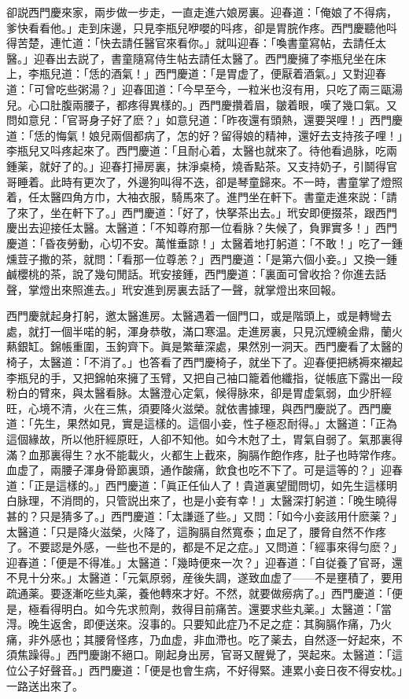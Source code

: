 卻説西門慶來家，兩步做一步走，一直走進六娘房裏。迎春道：「俺娘了不得病，爹快看看他。」走到床邊，只見李瓶兒咿嚶的呌疼，卻是胃脘作疼。西門慶聽他呌得苦楚，連忙道：「快去請任醫官來看你。」就叫迎春：「喚書童寫帖，去請任太醫。」迎春出去説了，書童隨寫侍生帖去請任太醫了。西門慶擁了李瓶兒坐在床上，李瓶兒道：「恁的酒氣！」西門慶道：「是胃虚了，便厭着酒氣。」又對迎春道：「可曾吃些粥湯？」迎春囬道：「今早至今，一粒米也沒有用，只吃了兩三甌湯兒。心口肚腹兩腰子，都疼得異樣的。」西門慶攢着眉，皺着眼，嘆了幾口氣。又問如意兒：「官哥身子好了麽？」如意兒道：「昨夜還有頭熱，還要哭哩！」西門慶道：「恁的悔氣！娘兒兩個都病了，怎的好？留得娘的精神，還好去支持孩子哩！」李瓶兒又呌疼起來了。西門慶道：「且耐心着，太醫也就來了。待他看過脉，吃兩鍾薬，就好了的。」迎春打掃房裏，抹淨桌椅，燒香點茶。又支持奶子，引鬬得官哥睡着。此時有更次了，外邊狗叫得不迭，卻是琴童歸來。不一時，書童掌了燈照着，任太醫四角方巾，大袖衣服，騎馬來了。進門坐在軒下。書童走進來説：「請了來了，坐在軒下了。」西門慶道：「好了，快拏茶出去。」玳安即便掇茶，跟西門慶出去迎接任太醫。太醫道：「不知尊府那一位看脉？失候了，負罪實多！」西門慶道：「昏夜勞動，心切不安。萬惟垂諒！」太醫着地打躬道：「不敢！」吃了一鍾燻荳子撒的茶，就問：「看那一位尊恙？」西門慶道：「是第六個小妾。」又換一鍾鹹櫻桃的茶，說了幾句閒話。玳安接鍾，西門慶道：「裏面可曾收拾？你進去話聲，掌燈出來照進去。」玳安進到房裏去話了一聲，就掌燈出來回報。

西門慶就起身打躬，邀太醫進房。太醫遇着一個門口，或是階頭上，或是轉彎去處，就打一個半喏的躬，渾身恭敬，滿口寒温。走進房裏，只見沉煙繞金鼎，蘭火爇銀缸。錦帳重圍，玉鉤齊下。眞是繁華深處，果然別一洞天。西門慶看了太醫的椅子，太醫道：「不消了。」也答看了西門慶椅子，就坐下了。迎春便把綉褥來襯起李瓶兒的手，又把錦帕來擁了玉臂，又把自己袖口籠着他纖指，従帳底下露出一段粉白的臂來，與太醫看脉。太醫澄心定氣，候得脉來，卻是胃虚氣弱，血少肝經旺，心境不清，火在三焦，須要降火滋榮。就依書據理，與西門慶説了。西門慶道：「先生，果然如見，實是這樣的。這個小妾，性子極忍耐得。」太醫道：「正為這個緣故，所以他肝經原旺，人卻不知他。如今木尅了土，胃氣自弱了。氣那裏得滿？血那裏得生？水不能載火，火都生上截來，胸膈作飽作疼，肚子也時常作疼。血虚了，兩腰子渾身骨節裏頭，通作酸痛，飲食也吃不下了。可是這等的？」迎春道：「正是這樣的。」西門慶道：「眞正任仙人了！貴道裏望聞問切，如先生這樣明白脉理，不消問的，只管説出來了，也是小妾有幸！」太醫深打躬道：「晚生曉得甚的？只是猜多了。」西門慶道：「太謙遜了些。」又問：「如今小妾該用什麽薬？」太醫道：「只是降火滋榮，火降了，這胸膈自然寬泰；血足了，腰脅自然不作疼了。不要認是外感，一些也不是的，都是不足之症。」又問道：「經事來得匀麽？」迎春道：「便是不得准。」太醫道：「幾時便來一次？」迎春道：「自従養了官哥，還不見十分來。」太醫道：「元氣原弱，産後失調，遂致血虚了——不是壅積了，要用疏通薬。要逐漸吃些丸薬，養他轉來才好。不然，就要做癆病了。」西門慶道：「便是，極看得明白。如今先求煎劑，救得目前痛苦。還要求些丸薬。」太醫道：「當淂。晚生返舍，即便送來。沒事的。只要知此症乃不足之症：其胸膈作痛，乃火痛，非外感也；其腰脅怪疼，乃血虚，非血滯也。吃了薬去，自然逐一好起來，不須焦躁得。」西門慶謝不絕口。剛起身出房，官哥又醒覺了，哭起來。太醫道：「這位公子好聲音。」西門慶道：「便是也會生病，不好得緊。連累小妾日夜不得安枕。」一路送出來了。

